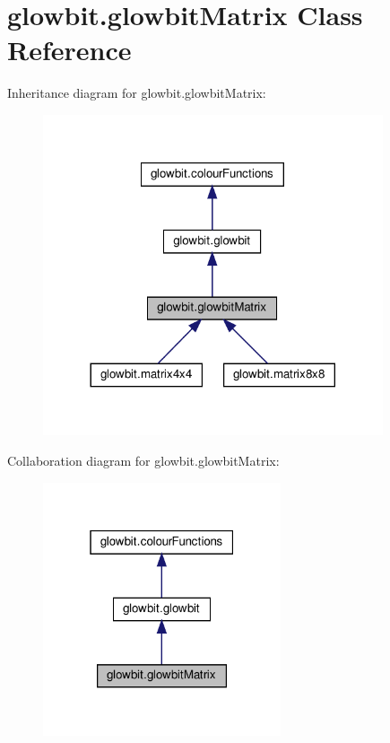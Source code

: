 \hypertarget{classglowbit_1_1glowbitMatrix}{}\section{glowbit.\+glowbit\+Matrix Class Reference}
\label{classglowbit_1_1glowbitMatrix}


Inheritance diagram for glowbit.\+glowbit\+Matrix\+:\nopagebreak
\begin{figure}[H]
\begin{center}
\leavevmode
\includegraphics[width=284pt]{classglowbit_1_1glowbitMatrix__inherit__graph}
\end{center}
\end{figure}


Collaboration diagram for glowbit.\+glowbit\+Matrix\+:\nopagebreak
\begin{figure}[H]
\begin{center}
\leavevmode
\includegraphics[width=199pt]{classglowbit_1_1glowbitMatrix__coll__graph}
\end{center}
\end{figure}
